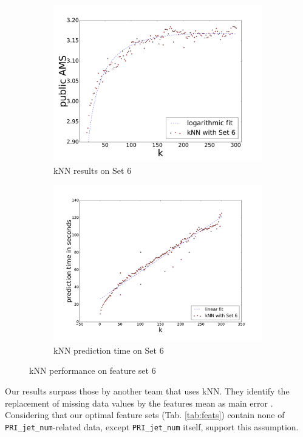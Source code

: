 \begin{figure}
	\centering
	\begin{subfigure}[b]{0.49\textwidth}
		\includegraphics[trim=30 0 40 0,clip,width=\textwidth]{images/knn_ams.pdf}
        \caption{kNN results on Set 6}
        \label{fig:knnams}
	\end{subfigure}
	\begin{subfigure}[b]{0.49\textwidth}
		\includegraphics[trim=30 0 40 0,clip,width=\textwidth]{images/knn_speed.pdf}
        \caption{kNN prediction time on Set 6}
        \label{fig:knnspeed}
	\end{subfigure}
	\caption{kNN performance on feature set 6}
	\label{fig:knn_perf}
\end{figure}

Our results surpass those by another team that uses kNN. They identify the replacement of missing data values by the features mean as main error \cite{california}. Considering that our optimal feature sets (Tab. \ref{tab:feats}) contain none of \texttt{PRI\_jet\_num}-related data, except \texttt{PRI\_jet\_num} itself, support this assumption.